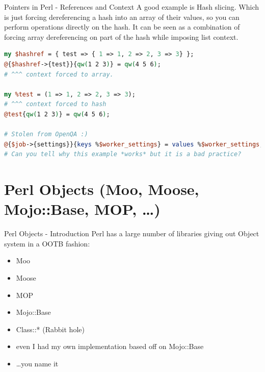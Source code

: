 \documentclass[10pt]{beamer}
\begin{document}
\begin{frame}[fragile]{Pointers in Perl - References and Context}
A good example is Hash slicing. Which is just forcing dereferencing a hash into an array of their values, so you can perform operations directly on the hash. It can be seen as a combination of forcing array dereferencing on part of the hash while imposing list context.

\begin{lstlisting}[language=perl]
my $hashref = { test => { 1 => 1, 2 => 2, 3 => 3} };
@{$hashref->{test}}{qw(1 2 3)} = qw(4 5 6);
# ^^^ context forced to array.

my %test = (1 => 1, 2 => 2, 3 => 3);
# ^^^ context forced to hash
@test{qw(1 2 3)} = qw(4 5 6);

# Stolen from OpenQA :)
@{$job->{settings}}{keys %$worker_settings} = values %$worker_settings; # BAD!
# Can you tell why this example *works* but it is a bad practice?
\end{lstlisting}


\end{frame}


\section{Perl Objects (Moo, Moose, Mojo::Base, MOP, \ldots)}

\begin{frame}[fragile]{Perl Objects - Introduction}
Perl has a large number of libraries giving out Object system in a OOTB fashion:
\begin{itemize}
\item Moo
\item Moose
\item MOP
\item Mojo::Base
\item Class::* (Rabbit hole)
\item even I had my own implementation based off on Mojo::Base
\item \ldots you name it
\end{itemize}
\end{frame}
\end{document}

